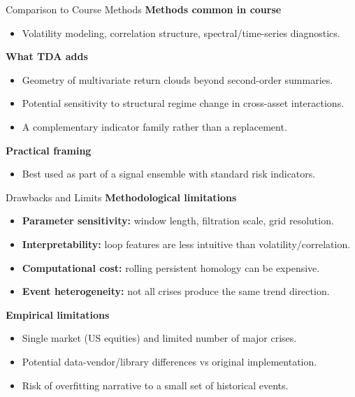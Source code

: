 \documentclass[aspectratio=169,10pt]{beamer}
\begin{document}
\begin{frame}{Comparison to Course Methods}
\textbf{Methods common in course}
\begin{itemize}
  \item Volatility modeling, correlation structure, spectral/time-series diagnostics.
\end{itemize}

\textbf{What TDA adds}
\begin{itemize}
  \item Geometry of multivariate return clouds beyond second-order summaries.
  \item Potential sensitivity to structural regime change in cross-asset interactions.
  \item A complementary indicator family rather than a replacement.
\end{itemize}

\textbf{Practical framing}
\begin{itemize}
  \item Best used as part of a signal ensemble with standard risk indicators.
\end{itemize}
\end{frame}

\begin{frame}{Drawbacks and Limits}
\textbf{Methodological limitations}
\begin{itemize}
  \item \textbf{Parameter sensitivity:} window length, filtration scale, grid resolution.
  \item \textbf{Interpretability:} loop features are less intuitive than volatility/correlation.
  \item \textbf{Computational cost:} rolling persistent homology can be expensive.
  \item \textbf{Event heterogeneity:} not all crises produce the same trend direction.
\end{itemize}

\textbf{Empirical limitations}
\begin{itemize}
  \item Single market (US equities) and limited number of major crises.
  \item Potential data-vendor/library differences vs original implementation.
  \item Risk of overfitting narrative to a small set of historical events.
\end{itemize}
\end{frame}
\end{document}
